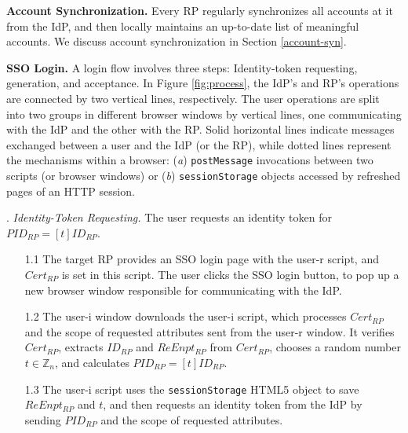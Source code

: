 \noindent\textbf{Account Synchronization.} 
Every RP regularly synchronizes all accounts at it from the IdP,
    and then locally maintains an up-to-date list of meaningful accounts.
We discuss account synchronization in Section \ref{account-syn}.


\noindent\textbf{SSO Login.} 
A login flow %
involves three steps: Identity-token requesting, generation, and acceptance.
In Figure \ref{fig:process}, the IdP's and RP's operations are connected by two vertical lines, respectively. The user operations are split into two groups in different browser windows by vertical lines, one communicating with the IdP and the other with the RP. Solid horizontal lines indicate messages exchanged between a user and the IdP (or the RP), while dotted lines represent the mechanisms within a browser:
(\emph{a}) \verb+postMessage+ invocations between two scripts (or browser windows)
or (\emph{b}) \verb+sessionStorage+ objects accessed by refreshed pages of an HTTP session.


. {\em Identity-Token Requesting.}
The user requests an identity token for $PID_{RP} = [t]{ID_{RP}}$.
\begin{itemize}
\setlength{\topsep}{0pt}
\setlength{\partopsep}{0pt}
\setlength{\itemsep}{0pt}
\setlength{\parsep}{0pt}
\setlength{\parskip}{0pt}
\item[1.1]
The target RP provides an SSO login page with the user-r script,
    and $Cert_{RP}$ is set in this script.
The user clicks the SSO login button,
    to pop up a new browser window responsible for communicating with the IdP.
\item[1.2] The user-i window downloads the user-i script,
which processes $Cert_{RP}$ and the scope of requested attributes sent from the user-r window.
It verifies $Cert_{RP}$, extracts $ID_{RP}$ and $ReEnpt_{RP}$ from $Cert_{RP}$, 
chooses a random number $t \in \mathbb{Z}_n$,
    and calculates $PID_{RP}=[t]{ID_{RP}}$.
\item[1.3] 
The user-i script uses the \verb+sessionStorage+ HTML5 object to save $ReEnpt_{RP}$ and $t$,
    and then requests an identity token from the IdP by sending $PID_{RP}$ and the scope of requested attributes.
\end{itemize}


